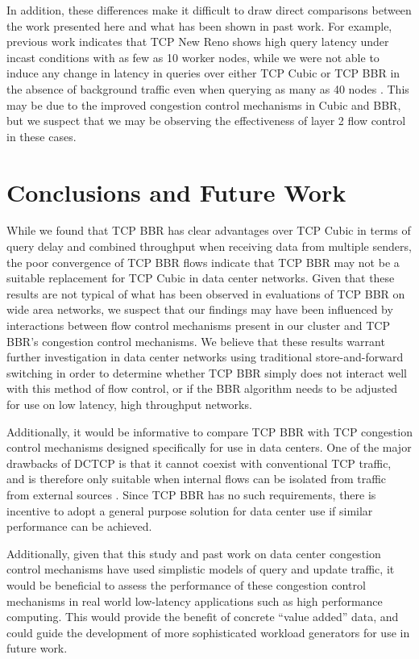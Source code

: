 \documentclass[letterpaper,twocolumn,10pt]{article}
\begin{document}
In addition, these differences make it difficult to draw direct comparisons between the work presented here and what has been shown in past work. For example, previous work indicates that TCP New Reno shows high query latency under incast conditions with as few as 10 worker nodes, while we were not able to induce any change in latency in queries over either TCP Cubic or TCP BBR in the absence of background traffic even when querying as many as 40 nodes \cite{alizadeh_data_2010, wu_ictcp:_2013}. This may be due to the improved congestion control mechanisms in Cubic and BBR, but we suspect that we may be observing the effectiveness of layer 2 flow control in these cases.

\section{Conclusions and Future Work}

While we found that TCP BBR has clear advantages over TCP Cubic in terms of query delay and combined throughput when receiving data from multiple senders, the poor convergence of TCP BBR flows indicate that TCP BBR may not be a suitable replacement for TCP Cubic in data center networks. Given that these results are not typical of what has been observed in evaluations of TCP BBR on wide area networks, we suspect that our findings may have been influenced by interactions between flow control mechanisms present in our cluster and TCP BBR's congestion control mechanisms. We believe that these results warrant further investigation in data center networks using traditional store-and-forward switching in order to determine whether TCP BBR simply does not interact well with this method of flow control, or if the BBR algorithm needs to be adjusted for use on low latency, high throughput networks.

Additionally, it would be informative to compare TCP BBR with TCP congestion control mechanisms designed specifically for use in data centers. One of the major drawbacks of DCTCP is that it cannot coexist with conventional TCP traffic, and is therefore only suitable when internal flows can be isolated from traffic from external sources \cite{alizadeh_data_2010}. Since TCP BBR has no such requirements, there is incentive to adopt a general purpose solution for data center use if similar performance can be achieved.

Additionally, given that this study and past work on data center congestion control mechanisms have used simplistic models of query and update traffic, it would be beneficial to assess the performance of these congestion control mechanisms in real world low-latency applications such as high performance computing. This would provide the benefit of concrete ``value added'' data, and could guide the development of more sophisticated workload generators for use in future work.
\end{document}
